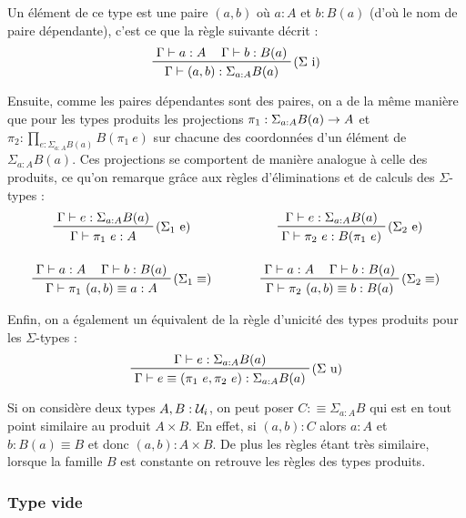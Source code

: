 \documentclass[../../rapport.tex]{subfiles}
\begin{document}
  Un élément de ce type est une paire $(a, b)$ où $a : A$ et $b : B(a)$ (d'où le nom de paire dépendante),
  c'est ce que la règle suivante décrit :
  $$\prfinterspace=1.2em
  \prftree[r]{($\Sigma$ i)}
    {\Gamma \vdash a : A}
    {\Gamma \vdash b : B(a)}
  {\Gamma \vdash (a, b) : \Sigma_{a:A}B(a)}
  $$

  Ensuite, comme les paires dépendantes sont des paires, on a de la même manière que pour les types produits les projections
  $\pi_1 : \Sigma_{a:A}B(a) \rightarrow A$ et $\pi_2 : \prod_{e : \Sigma_{a:A}B(a)}B(\pi_1\ e)$ sur chacune des coordonnées d'un élément
  de $\Sigma_{a:A}B(a)$.
  Ces projections se comportent de manière analogue à celle des produits, ce qu'on remarque grâce aux règles d'éliminations et de calculs
  des $\Sigma$-types :
  $$
  \prfinterspace=1.2em
  \begin{array}{cc}
    \prftree[r]{($\Sigma_1$ e)}
      {\Gamma \vdash e : \Sigma_{a:A}B(a)}
      {\Gamma \vdash \pi_1\ e : A}
    \hspace{1cm} &
    \prftree[r]{($\Sigma_2$ e)}
      {\Gamma \vdash e : \Sigma_{a:A}B(a)}
      {\Gamma \vdash \pi_2\ e : B(\pi_1\ e)}
    \vspace{1.5em} \\
    \prftree[r]{($\Sigma_1 \equiv$)}
      {\Gamma \vdash a : A}
      {\Gamma \vdash b : B(a)}
      {\Gamma \vdash \pi_1\ (a, b) \equiv a : A}
    \hspace{1cm} &
    \prftree[r]{($\Sigma_2 \equiv$)}
      {\Gamma \vdash a : A}
      {\Gamma \vdash b : B(a)}
      {\Gamma \vdash \pi_2\ (a, b) \equiv b : B(a)}
  \end{array}
  $$

  Enfin, on a également un équivalent de la règle d'unicité des types produits pour les $\Sigma$-types :
  $$
  \prfinterspace=1.2em
  \prftree[r]{($\Sigma$ u)}
    {\Gamma \vdash e : \Sigma_{a:A}B(a)}
    {\Gamma \vdash e \equiv (\pi_1\ e, \pi_2\ e) : \Sigma_{a:A}B(a)}
  $$

  \begin{example}
    Si on considère deux types $A, B : \mathcal U_i$, on peut poser $C :\equiv \Sigma_{a:A}B$ qui est en tout point similaire au produit $A \times B$.
    En effet, si $(a, b) : C$ alors $a: A$ et $b : B(a) \equiv B$ et donc $(a, b) : A \times B$.
    De plus les règles étant très similaire, lorsque la famille $B$ est constante on retrouve les règles des types produits.
  \end{example}

  \subsubsection{Type vide}
\end{document}
